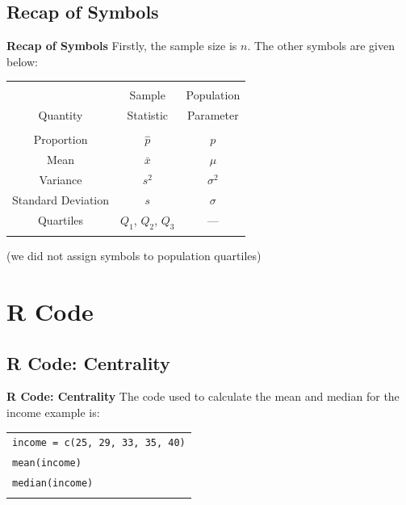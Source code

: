 \documentclass[compress]{beamer}        %
\makeatletter
\newcommand{\tcb}{\textcolor{beamer@blendedblue}}
\makeatother
\begin{document}
\subsection{Recap of Symbols}
\begin{frame}{\bf \tcb{Recap of Symbols}}
Firstly, the sample size is $n$. The other symbols are given below:\\[0.3cm]
\begin{center}
\begin{tabular}{|c|c|c|}
\hline
&&\\[-0.3cm]
& Sample & Population \\
Quantity & Statistic & Parameter \\[0.1cm]
\hline
&&\\[-0.3cm]
Proportion & $\hat p$ & $p$ \\[0.2cm]
Mean & $\bar x$ & $\mu$ \\[0.2cm]
Variance & $s^2$ & $\sigma^2$ \\[0.2cm]
Standard Deviation & $s$\phantom{$^2$} & $\sigma$\phantom{$^2$} \\[0.2cm]
Quartiles & $Q_1$, $Q_2$, $Q_3$ & ---\\[0.2cm]
\hline
\multicolumn{3}{c}{}\\
\end{tabular}
\end{center}
{\footnotesize(we did not assign symbols to population quartiles)}
\end{frame}




\section{R Code}
\subsection{R Code: Centrality}
\begin{frame}{\bf \tcb{R Code: Centrality}}
The code used to calculate the mean and median for the income example is:\\[0.6cm]
\begin{tabular}{|l|}
\hline
\texttt{income = c(25, 29, 33, 35, 40)}\\
\texttt{mean(income)}\\
\texttt{median(income)}\\
\hline
\multicolumn{1}{c}{}\\[-0.1cm]
\end{tabular}

\end{frame}
\end{document}
